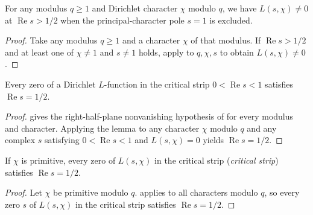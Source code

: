 \begin{theorem}
\label{thm:right-nonvanishing}
\emitthmsource
For any modulus $q\ge1$ and Dirichlet character $\chi$ modulo $q$, we have $L(s,\chi)\ne0$ at $\operatorname{Re}s>1/2$ when the principal-character pole $s=1$ is excluded.
\end{theorem}
\begin{proof}
Take any modulus $q\ge1$ and a character $\chi$ of that modulus. If $\operatorname{Re}s>1/2$ and at least one of $\chi\ne1$ and $s\ne1$ holds, apply  to $q,\chi,s$ to obtain $L(s,\chi)\ne0$.
\end{proof}

\begin{theorem}
\label{thm:l-zeros}
\emitthmsource
Every zero of a Dirichlet $L$-function in the critical strip $0<\operatorname{Re}s<1$ satisfies $\operatorname{Re}s=1/2$.
\end{theorem}
\begin{proof}
 gives the right-half-plane nonvanishing hypothesis of  for every modulus and character. Applying the lemma to any character $\chi$ modulo $q$ and any complex $s$ satisfying $0<\operatorname{Re}s<1$ and $L(s,\chi)=0$ yields $\operatorname{Re}s=1/2$.
\end{proof}

\begin{theorem}
\label{thm:primitive}
\emitthmsource
If $\chi$ is primitive, every zero of $L(s,\chi)$ in the critical strip (\emph{critical strip}) satisfies $\operatorname{Re}s=1/2$.
\end{theorem}
\begin{proof}
Let $\chi$ be primitive modulo $q$.  applies to all characters modulo $q$, so every zero $s$ of $L(s,\chi)$ in the critical strip satisfies $\operatorname{Re}s=1/2$.
\end{proof}
